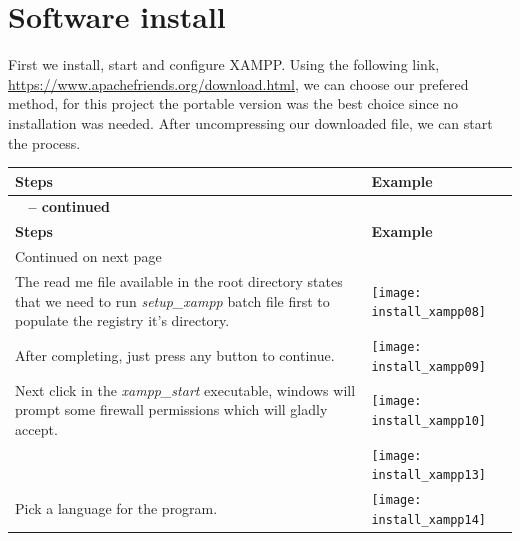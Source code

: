 \documentclass[11pt,a4paper]{report}
\begin{document}
    \section{Software install}
        \begin{flushleft}
            First we install, start and configure XAMPP. Using the following link, \href{https://www.apachefriends.org/download.html}{https://www.apachefriends.org/download.html}, we can choose our prefered method, for this project the portable version was the best choice since no installation was needed. After uncompressing our downloaded file, we can start the process.
                \begin{center}
                    \begin{longtable}{ m{5cm} l }
                        \textbf{Steps} & \textbf{Example} \\
                        \hline
                        \endfirsthead
                        {{\bfseries \tablename\ \thetable{} -- continued}} \\
                        \textbf{Steps} & \textbf{Example} \\
                        \hline
                        \endhead
                        \hline Continued on next page \\
                        \endfoot
                        \endlastfoot

                        The read me file available in the root directory states that we need to run \textit{setup\_xampp} batch file first to populate the registry it's directory.
                        & \texttt{[image: install\_xampp08]} \\
                        \hline
                        
                        After completing, just press any button to continue.
                        & \texttt{[image: install\_xampp09]} \\
                        \hline
                        
                        Next click in the \textit{xampp\_start} executable, windows will prompt some firewall permissions which will gladly accept.
                        & \texttt{[image: install\_xampp10]} \\
                        & \texttt{[image: install\_xampp13]} \\
                        \hline
                        
                        Pick a language for the program.
                        & \texttt{[image: install\_xampp14]} \\
                        \hline
                        

\end{longtable}
\end{center}
\end{flushleft}
\end{document}

